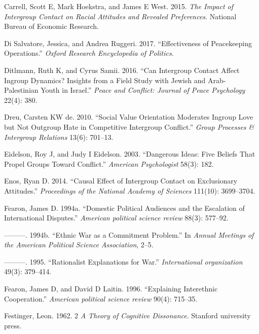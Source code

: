 \documentclass[11pt]{article}
\begin{document}
\leavevmode\hypertarget{ref-carrell2015impact}{}%
Carrell, Scott E, Mark Hoekstra, and James E West. 2015. \emph{The
Impact of Intergroup Contact on Racial Attitudes and Revealed
Preferences}. National Bureau of Economic Research.

\leavevmode\hypertarget{ref-di2017effectiveness}{}%
Di Salvatore, Jessica, and Andrea Ruggeri. 2017. ``Effectiveness of
Peacekeeping Operations.'' \emph{Oxford Research Encyclopedia of
Politics}.

\leavevmode\hypertarget{ref-ditlmann2016can}{}%
Ditlmann, Ruth K, and Cyrus Samii. 2016. ``Can Intergroup Contact Affect
Ingroup Dynamics? Insights from a Field Study with Jewish and
Arab-Palestinian Youth in Israel.'' \emph{Peace and Conflict: Journal of
Peace Psychology} 22(4): 380.

\leavevmode\hypertarget{ref-dreu2010social}{}%
Dreu, Carsten KW de. 2010. ``Social Value Orientation Moderates Ingroup
Love but Not Outgroup Hate in Competitive Intergroup Conflict.''
\emph{Group Processes \& Intergroup Relations} 13(6): 701--13.

\leavevmode\hypertarget{ref-eidelson2003dangerous}{}%
Eidelson, Roy J, and Judy I Eidelson. 2003. ``Dangerous Ideas: Five
Beliefs That Propel Groups Toward Conflict.'' \emph{American
Psychologist} 58(3): 182.

\leavevmode\hypertarget{ref-enos2014causal}{}%
Enos, Ryan D. 2014. ``Causal Effect of Intergroup Contact on
Exclusionary Attitudes.'' \emph{Proceedings of the National Academy of
Sciences} 111(10): 3699--3704.

\leavevmode\hypertarget{ref-fearon1994domestic}{}%
Fearon, James D. 1994a. ``Domestic Political Audiences and the
Escalation of International Disputes.'' \emph{American political science
review} 88(3): 577--92.

\leavevmode\hypertarget{ref-fearon1994ethnic}{}%
---------. 1994b. ``Ethnic War as a Commitment Problem.'' In
\emph{Annual Meetings of the American Political Science Association},
2--5.

\leavevmode\hypertarget{ref-fearon1995rationalist}{}%
---------. 1995. ``Rationalist Explanations for War.''
\emph{International organization} 49(3): 379--414.

\leavevmode\hypertarget{ref-fearon1996explaining}{}%
Fearon, James D, and David D Laitin. 1996. ``Explaining Interethnic
Cooperation.'' \emph{American political science review} 90(4): 715--35.

\leavevmode\hypertarget{ref-festinger1962cognitiveDissonance}{}%
Festinger, Leon. 1962. 2 \emph{A Theory of Cognitive Dissonance}.
Stanford university press.
\end{document}
